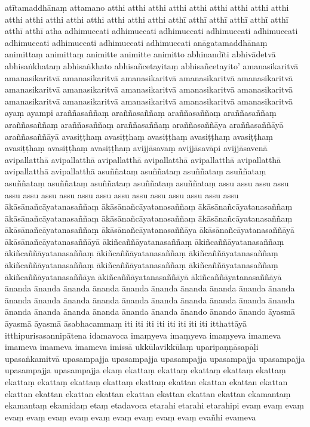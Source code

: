 \documentclass[12pt]{article}
\begin{document}
\begin{multicols}{5}
atītamaddhānaṃ
attamano
atthi
atthi
atthi
atthi
atthi
atthi
atthi
atthi
atthi
atthi
atthi
atthi
atthi
atthi
atthi
atthi
atthi
atthī
atthī
atthī
atthī
atthī
atthī
atthī
atthī
atha
adhimuccati
adhimuccati
adhimuccati
adhimuccati
adhimuccati
adhimuccati
adhimuccati
adhimuccati
adhimuccati
anāgatamaddhānaṃ
animittaṃ
animittaṃ
animitte
animitte
animitto
abhinandīti
abhivādetvā
abhisaṅkhataṃ
abhisaṅkhato
abhisañcetayitaṃ
abhisañcetayito’
amanasikaritvā
amanasikaritvā
amanasikaritvā
amanasikaritvā
amanasikaritvā
amanasikaritvā
amanasikaritvā
amanasikaritvā
amanasikaritvā
amanasikaritvā
amanasikaritvā
amanasikaritvā
amanasikaritvā
amanasikaritvā
amanasikaritvā
amanasikaritvā
ayaṃ
ayampi
araññasaññaṃ
araññasaññaṃ
araññasaññaṃ
araññasaññaṃ
araññasaññaṃ
araññasaññaṃ
araññasaññaṃ
araññasaññāya
araññasaññāyā
araññasaññāyā
avasiṭṭhaṃ
avasiṭṭhaṃ
avasiṭṭhaṃ
avasiṭṭhaṃ
avasiṭṭhaṃ
avasiṭṭhaṃ
avasiṭṭhaṃ
avasiṭṭhaṃ
avijjāsavaṃ
avijjāsavāpi
avijjāsavenā
avipallatthā
avipallatthā
avipallatthā
avipallatthā
avipallatthā
avipallatthā
avipallatthā
avipallatthā
asuññataṃ
asuññataṃ
asuññataṃ
asuññataṃ
asuññataṃ
asuññataṃ
asuññataṃ
asuññataṃ
asuññataṃ
assu
assu
assu
assu
assu
assu
assu
assu
assu
assu
assu
assu
assu
assu
assu
assu
assu
ākāsānañcāyatanasaññaṃ
ākāsānañcāyatanasaññaṃ
ākāsānañcāyatanasaññaṃ
ākāsānañcāyatanasaññaṃ
ākāsānañcāyatanasaññaṃ
ākāsānañcāyatanasaññaṃ
ākāsānañcāyatanasaññaṃ
ākāsānañcāyatanasaññāya
ākāsānañcāyatanasaññāyā
ākāsānañcāyatanasaññāyā
ākiñcaññāyatanasaññaṃ
ākiñcaññāyatanasaññaṃ
ākiñcaññāyatanasaññaṃ
ākiñcaññāyatanasaññaṃ
ākiñcaññāyatanasaññaṃ
ākiñcaññāyatanasaññaṃ
ākiñcaññāyatanasaññaṃ
ākiñcaññāyatanasaññaṃ
ākiñcaññāyatanasaññāya
ākiñcaññāyatanasaññāyā
ākiñcaññāyatanasaññāyā
ānanda
ānanda
ānanda
ānanda
ānanda
ānanda
ānanda
ānanda
ānanda
ānanda
ānanda
ānanda
ānanda
ānanda
ānanda
ānanda
ānanda
ānanda
ānanda
ānanda
ānanda
ānanda
ānanda
ānanda
ānanda
ānanda
ānando
ānando
ānando
āyasmā
āyasmā
āyasmā
āsabhacammaṃ
iti
iti
iti
iti
iti
iti
iti
iti
itthattāyā
itthipurisasannipātena
idamavoca
imaṃyeva
imaṃyeva
imaṃyeva
imameva
imameva
imameva
imameva
imissā
ukkūlavikkūlaṃ
uparipaṇṇāsapāḷi
upasaṅkamitvā
upasampajja
upasampajja
upasampajja
upasampajja
upasampajja
upasampajja
upasampajja
ekaṃ
ekattaṃ
ekattaṃ
ekattaṃ
ekattaṃ
ekattaṃ
ekattaṃ
ekattaṃ
ekattaṃ
ekattaṃ
ekattaṃ
ekattan
ekattan
ekattan
ekattan
ekattan
ekattan
ekattan
ekattan
ekattan
ekattan
ekattan
ekattan
ekamantaṃ
ekamantaṃ
ekamidaṃ
etaṃ
etadavoca
etarahi
etarahi
etarahipi
evaṃ
evaṃ
evaṃ
evaṃ
evaṃ
evaṃ
evaṃ
evaṃ
evaṃ
evaṃ
evaṃ
evaṃ
evañhi
evameva

\end{multicols}
\end{document}
